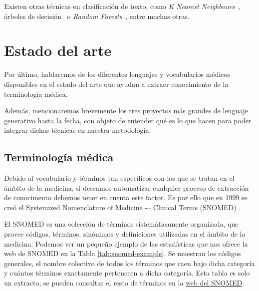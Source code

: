 Existen otras técnicas en clasificación de texto, como \textit{K Nearest Neighbours}~\cite{KNNXiao2007}, árboles de decisión~\cite{DecisionTreeNoorman2018} o \textit{Random Forests}~\cite{breiman2001random}, entre muchas otras. 

\section{Estado del arte}

Por último, hablaremos de los diferentes lenguajes y vocabularios médicos disponibles en el estado del arte que ayudan a extraer conocimiento de la terminología médica.

Además, mencionaremos brevemente los tres proyectos más grandes de lenguaje generativo hasta la fecha, con objeto de entender qué es lo que hacen para poder integrar dichas técnicas en nuestra metodología.

\subsection{Terminología médica}

Debido al vocabulario y términos tan específicos con los que se tratan en el ámbito de la medicina, si deseamos automatizar cualquier proceso de extracción de conocimento debemos tener en cuenta este factor. Es por ello que en 1999 se creó el Systemized Nomenclature of Medicine -– Clinical Terms (SNOMED) \cite{snomed}. 

El SNOMED es una colección de términos sistemáticamente organizada, que provee códigos, términos, sinónimos y definiciones utilizadas en el ámbito de la medicina. Podemos ver un pequeño ejemplo de las estadísticas que nos ofrece la web de SNOMED en la Tabla \ref{tab:snomed-example}. Se muestran los códigos generales, el nombre colectivo de todos los términos que caen bajo dicha categoría y cuántos términos exactamente pertenecen a dicha categoría. Esta tabla es solo un extracto, se pueden consultar el resto de términos en la \href{https://www.nlm.nih.gov/research/umls/sourcereleasedocs/current/SCTSPA/stats.html}{web del SNOMED}.

